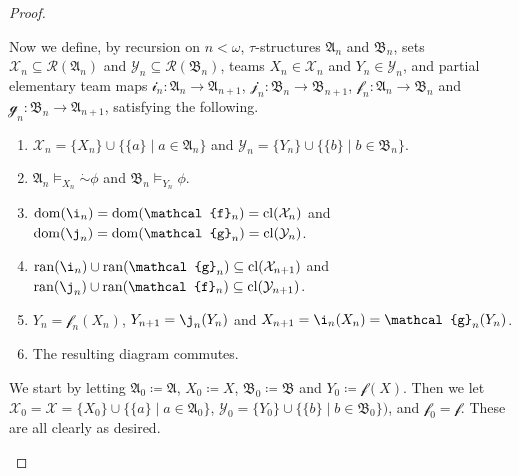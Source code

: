 \documentclass[a4paper]{amsart}
\theoremstyle{definition}
\theoremstyle{remark}
\newcommand{\A}{\mathcal{A}}
\newcommand{\B}{\mathcal{B}}
\DeclareMathOperator{\dom}{dom}
\DeclareMathOperator{\ran}{ran}
\newcommand{\cneg}{\mathord{\dot{\sim}}}
\newcommand{\R}{\mathcal{R}}
\newcommand{\Y}{\mathcal{Y}}
\newcommand{\X}{\mathcal{X}}
\theoremstyle{definition}
\renewcommand{\A}{\mathfrak{A}}
\renewcommand{\B}{\mathfrak{B}}
\newcommand{\f}{\mathcal{f}}
\newcommand{\g}{\mathcal{g}}
\DeclareMathOperator{\cl}{cl}
\begin{document}
\begin{proof}
\begin{enumerate}
        Now we define, by recursion on $n<\omega$, $\tau$-structures $\A_n$ and $\B_n$, sets $\X_n\subseteq\R(\A_n)$ and $\Y_n\subseteq\R(\B_n)$, teams $X_n\in\X_n$ and $Y_n\in\Y_n$, and partial elementary team maps $\mathcal i_n\colon\A_n\to\A_{n+1}$, $\mathcal j_n\colon\B_n\to\B_{n+1}$, $\f_n\colon\A_n\to\B_n$ and $\g_n\colon\B_n\to\A_{n+1}$, satisfying the following.
        \begin{enumerate}
            \item $\X_n = \{X_n\}\cup\{\{a\}\mid a\in\A_n\}$ and $\Y_n = \{Y_n\}\cup\{\{b\} \mid b\in\B_n\}$.
            \item $\A_n\models_{X_n}\cneg\phi$ and $\B_n\models_{Y_n}\phi$.
            \item $\dom(\i_n) = \dom(\f_n) = \cl(\X_n)$ and $\dom(\j_n) = \dom(\g_n) = \cl(\Y_n)$.
            \item $\ran(\i_n)\cup\ran(\g_n)\subseteq\cl(\X_{n+1})$ and $\ran(\j_n)\cup\ran(\f_n)\subseteq\cl(\Y_{n+1})$.
            \item $Y_n = \f_n(X_n)$, $Y_{n+1} = \j_n(Y_n)$ and $X_{n+1} = \i_n(X_n) = \g_n(Y_n)$.
            \item The resulting diagram commutes.
        \end{enumerate}
        \begin{center}
            \bigskip
            \bigskip
        \end{center}
        
        \noindent We start by letting $\A_0\coloneqq\A$, $X_0\coloneqq X$, $\B_0\coloneqq\B$ and $Y_0\coloneqq\f(X)$. Then we let $\X_0 = \X = \{X_0\}\cup\{\{a\} \mid a\in\A_0\}$, $\Y_0 = \{Y_0\}\cup\{\{b\} \mid b\in\B_0 \})$, and $\f_0 = \f$. These are all clearly as desired.
        

\end{enumerate}
\end{proof}
\end{document}
